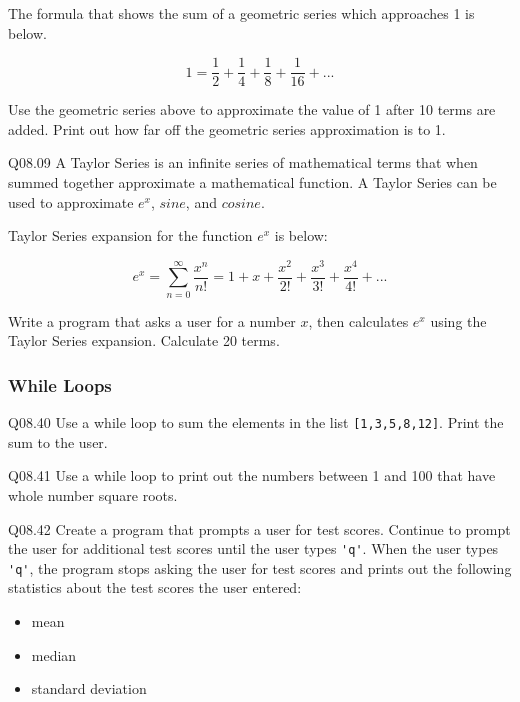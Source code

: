 \documentclass{book}
\newenvironment{problems}{}{}  %
\providecommand{\tightlist}{%
      \setlength{\itemsep}{0pt}\setlength{\parskip}{0pt}}
\newcommand{\passthrough}[1]{#1}
\begin{document}
\begin{problems}
The formula that shows the sum of a geometric series which approaches 1
is below.

\[ 1 = \frac{1}{2} + \frac{1}{4} + \frac{1}{8} + \frac{1}{16} + ... \]

Use the geometric series above to approximate the value of 1 after 10
terms are added. Print out how far off the geometric series
approximation is to 1.

Q08.09 A Taylor Series is an infinite series of mathematical terms that
when summed together approximate a mathematical function. A Taylor
Series can be used to approximate \(e^x\), \(sine\), and \(cosine\).

Taylor Series expansion for the function \(e^x\) is below:

\[  {e^x} = \sum\limits_{n = 0}^\infty  {\frac{{{x^n}}}{{n!}}}  = 1 + x + \frac{{{x^2}}}{{2!}} + \frac{{{x^3}}}{{3!}} + \frac{{{x^4}}}{{4!}} + ... \]

Write a program that asks a user for a number \(x\), then calculates
\(e^x\) using the Taylor Series expansion. Calculate 20 terms.
        \end{problems}

    




    
        \hypertarget{while-loops}{%
\subsubsection{While Loops}\label{while-loops}}
    




    
        Q08.40 Use a while loop to sum the elements in the list
\passthrough{\lstinline![1,3,5,8,12]!}. Print the sum to the user.

Q08.41 Use a while loop to print out the numbers between 1 and 100 that
have whole number square roots.

Q08.42 Create a program that prompts a user for test scores. Continue to
prompt the user for additional test scores until the user types
\passthrough{\lstinline!'q'!}. When the user types
\passthrough{\lstinline!'q'!}, the program stops asking the user for
test scores and prints out the following statistics about the test
scores the user entered:

\begin{itemize}
\tightlist
\item
  mean
\item
  median
\item
  standard deviation
\end{itemize}
\end{document}
